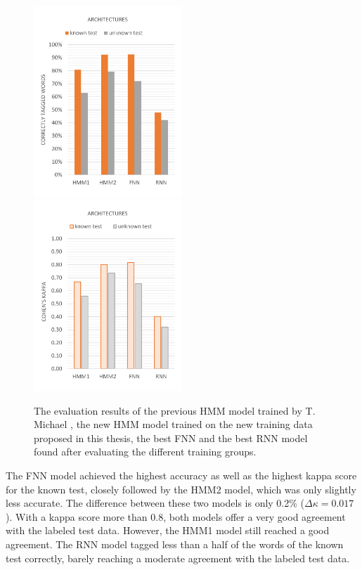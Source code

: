 \begin{figure}[H]
\centering
{}
{\includegraphics[width=0.495\textwidth]{images/comparison}}
{\includegraphics[width=0.495\textwidth]{images/comparison_k}}
\vspace{1em}
\caption[Comparison of all Architectures]{The evaluation results of the previous HMM model trained by T. Michael \cite{michael2016}, the new HMM model trained on the new training data proposed in this thesis, the best FNN and the best RNN model found after evaluating the different training groups.}
\label{f.evaluation.comparison}
\end{figure}

The FNN model achieved the highest accuracy as well as the highest kappa score for the known test, closely followed by the HMM2 model, which was only slightly less accurate. The difference between these two models is only 0.2\% ($\Delta\kappa=0.017$). With a kappa score more than 0.8, both models offer a very good agreement with the labeled test data. However, the HMM1 model still reached a good agreement. The RNN model tagged less than a half of the words of the known test correctly, barely reaching a moderate agreement with the labeled test data.

